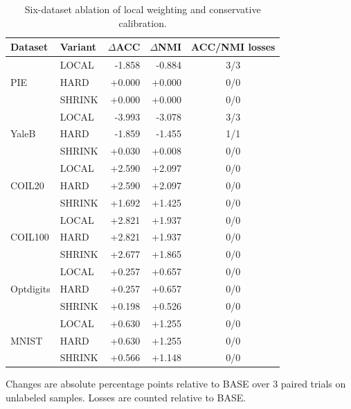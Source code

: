 \begin{table}[t]
\centering
\caption{Six-dataset ablation of local weighting and conservative calibration.}\label{tab:ablation6}
\small
\begin{tabular}{llrrc}
\toprule
Dataset & Variant & $\Delta$ACC & $\Delta$NMI & ACC/NMI losses \\
\midrule
\multirow{3}{*}{PIE} & LOCAL & -1.858 & -0.884 & 3/3 \\
& HARD & +0.000 & +0.000 & 0/0 \\
& SHRINK & +0.000 & +0.000 & 0/0 \\
\midrule
\multirow{3}{*}{YaleB} & LOCAL & -3.993 & -3.078 & 3/3 \\
& HARD & -1.859 & -1.455 & 1/1 \\
& SHRINK & +0.030 & +0.008 & 0/0 \\
\midrule
\multirow{3}{*}{COIL20} & LOCAL & +2.590 & +2.097 & 0/0 \\
& HARD & +2.590 & +2.097 & 0/0 \\
& SHRINK & +1.692 & +1.425 & 0/0 \\
\midrule
\multirow{3}{*}{COIL100} & LOCAL & +2.821 & +1.937 & 0/0 \\
& HARD & +2.821 & +1.937 & 0/0 \\
& SHRINK & +2.677 & +1.865 & 0/0 \\
\midrule
\multirow{3}{*}{Optdigits} & LOCAL & +0.257 & +0.657 & 0/0 \\
& HARD & +0.257 & +0.657 & 0/0 \\
& SHRINK & +0.198 & +0.526 & 0/0 \\
\midrule
\multirow{3}{*}{MNIST} & LOCAL & +0.630 & +1.255 & 0/0 \\
& HARD & +0.630 & +1.255 & 0/0 \\
& SHRINK & +0.566 & +1.148 & 0/0 \\
\bottomrule
\end{tabular}

\vspace{1mm}
\parbox{0.98\textwidth}{\footnotesize
Changes are absolute percentage points relative to BASE over 3 paired trials on unlabeled samples. Losses are counted relative to BASE.}
\end{table}
